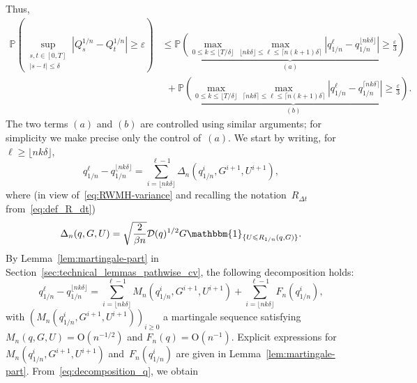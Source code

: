 \documentclass{article}
\renewcommand{\leq}{\leqslant}
\renewcommand{\geq}{\geqslant}
\def\P{\mathbb{P}} %
\newcommand{\Diff}{\mathcal{D}}
\begin{document}
Thus,
\begin{equation}
  \label{eq:decomposition_a_b_tightness}
  \begin{aligned}
    \P \left( \sup_{\substack{s,t\in[0,T]\\|s-t|\leq \delta}}\left|Q^{1/n}_s-Q^{1/n}_t\right|\geq \varepsilon\right)
    & \leq \underbrace{\P \left(\max_{0\leq k \leq \lfloor T/\delta \rfloor}\max_{\lfloor nk\delta \rfloor \leq \ell\leq \lceil n(k+1)\delta \rceil} \left|q_{1/n}^\ell - q_{1/n}^{\lfloor nk\delta \rfloor}\right| \geq\frac{\varepsilon}{3}\right)}_{(a)} \\
    & \ \ +  \underbrace{\P \left(\max_{0\leq k \leq \lfloor T/\delta \rfloor}\max_{\lceil nk\delta \rceil \leq \ell\leq \lceil n(k+1)\delta \rceil} \left|q_{1/n}^\ell - q_{1/n}^{\lceil nk\delta \rceil}\right| \geq\frac{\varepsilon}{3}\right)}_{(b)}.
  \end{aligned}
\end{equation}
The two terms $(a)$ and $(b)$ are controlled using similar arguments; for simplicity we make precise only the control of~$(a)$.  We start by writing, for~$\ell \geq \lfloor nk\delta \rfloor$, 
\begin{equation}
\label{eq:sum-increment}
q_{1/n}^\ell - q_{1/n}^{\lfloor nk\delta \rfloor} =\sum_{i = \lfloor nk\delta \rfloor}^{\ell - 1}\Delta_n(q^i_{1/n}, G^{i+1}, U^{i+1}) ,
\end{equation}
where (in view of~\eqref{eq:RWMH-variance} and recalling the notation~$R_{\Delta t}$ from~\eqref{eq:def_R_dt})
\begin{equation}
  \label{eq:increment}
\Delta_n(q, G, U) = \sqrt{\frac{2}{\beta n}}\Diff(q)^{1/2}G\mathbbm{1}_{\{U\leq R_{1/n}(q,G)\}}.
\end{equation}
By Lemma~\ref{lem:martingale-part} in Section~\ref{sec:technical_lemmas_pathwise_cv}, the following decomposition holds:
\begin{equation}
  \label{eq:decomposition_q}
  q_{1/n}^\ell - q_{1/n}^{\lfloor nk\delta \rfloor} =\sum_{i = \lfloor nk\delta \rfloor}^{\ell - 1}M_n(q^i_{1/n}, G^{i+1}, U^{i+1})+\sum_{i = \lfloor nk\delta \rfloor}^{\ell - 1}F_n(q^i_{1/n}),
\end{equation}
with $(M_n(q^i_{1/n}, G^{i+1}, U^{i+1}))_{i\geq 0}$ a martingale sequence satisfying $M_n(q, G, U) = \mathrm{O}(n^{-1/2})$ and $F_n(q) = \mathrm{O}(n^{-1})$. Explicit expressions for $M_n(q^i_{1/n}, G^{i+1}, U^{i+1})$ and~$F_n(q^i_{1/n})$ are given in Lemma~\ref{lem:martingale-part}. From~\eqref{eq:decomposition_q}, we obtain
\end{document}
